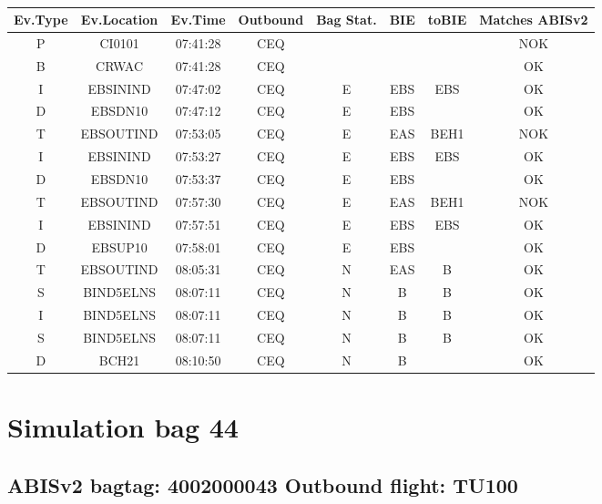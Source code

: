 \documentclass{report}
\begin{document}
\paragraph{}
\begin{longtable}{cccccccc}    \toprule
\rowcolor{white!50}
\textbf{Ev.Type} & \textbf{Ev.Location} & \textbf{Ev.Time} & \textbf{Outbound} & \textbf{Bag Stat.} & \textbf{BIE} & \textbf{toBIE} & \textbf{Matches ABISv2} \\\midrule
P & CI0101 & 07:41:28  & CEQ &  &  &  & NOK\\
B & CRWAC & 07:41:28  & CEQ &  &  &  & OK\\
I & EBSININD & 07:47:02  & CEQ & E & EBS & EBS & OK\\
D & EBSDN10 & 07:47:12  & CEQ & E & EBS &  & OK\\
T & EBSOUTIND & 07:53:05  & CEQ & E & EAS & BEH1 & NOK\\
I & EBSININD & 07:53:27  & CEQ & E & EBS & EBS & OK\\
D & EBSDN10 & 07:53:37  & CEQ & E & EBS &  & OK\\
T & EBSOUTIND & 07:57:30  & CEQ & E & EAS & BEH1 & NOK\\
I & EBSININD & 07:57:51  & CEQ & E & EBS & EBS & OK\\
D & EBSUP10 & 07:58:01  & CEQ & E & EBS &  & OK\\
T & EBSOUTIND & 08:05:31  & CEQ & N & EAS & B & OK\\
S & BIND5ELNS & 08:07:11  & CEQ & N & B & B & OK\\
I & BIND5ELNS & 08:07:11  & CEQ & N & B & B & OK\\
S & BIND5ELNS & 08:07:11  & CEQ & N & B & B & OK\\
D & BCH21 & 08:10:50  & CEQ & N & B &  & OK\\
\bottomrule
\end{longtable}
\pagebreak
\section*{Simulation bag 44}
\subsection*{ABISv2 bagtag: 4002000043 Outbound flight: TU100}
\end{document}
